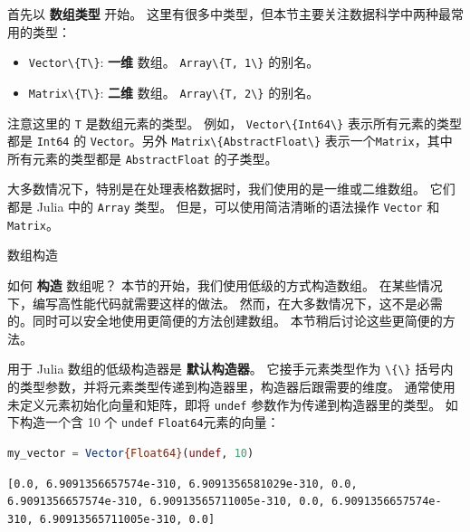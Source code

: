 \documentclass[
  notoc %
]{tufte-book}
\makeatletter
\providecommand{\tightlist}{%
  \setlength{\itemsep}{0pt}\setlength{\parskip}{0pt}
}
\newcommand{\passthrough}[1]{#1}
\renewcommand\subsubsection{%
\@startsection{subsubsection}{3}{\z@ }{-3.25ex\@plus -1ex \@minus -.2ex}{1.5ex \@plus .2ex}{\normalfont \normalsize \bfseries }
}
\makeatother
\begin{document}
首先以 \textbf{数组类型} 开始。
这里有很多中类型，但本节主要关注数据科学中两种最常用的类型：

\begin{itemize}
\tightlist
\item
  \passthrough{\lstinline!Vector\{T\}!}: \textbf{一维} 数组。
  \passthrough{\lstinline!Array\{T, 1\}!} 的别名。
\item
  \passthrough{\lstinline!Matrix\{T\}!}: \textbf{二维} 数组。
  \passthrough{\lstinline!Array\{T, 2\}!} 的别名。
\end{itemize}

注意这里的 \passthrough{\lstinline!T!} 是数组元素的类型。 例如，
\passthrough{\lstinline!Vector\{Int64\}!} 表示所有元素的类型都是
\passthrough{\lstinline!Int64!} 的
\passthrough{\lstinline!Vector!}。另外
\passthrough{\lstinline!Matrix\{AbstractFloat\}!}
表示一个\passthrough{\lstinline!Matrix!}，其中所有元素的类型都是
\passthrough{\lstinline!AbstractFloat!} 的子类型。

大多数情况下，特别是在处理表格数据时，我们使用的是一维或二维数组。
它们都是 Julia 中的 \passthrough{\lstinline!Array!} 类型。
但是，可以使用简洁清晰的语法操作 \passthrough{\lstinline!Vector!} 和
\passthrough{\lstinline!Matrix!}。

\hypertarget{sec:array_construction}{%
\subsubsection{数组构造}\label{sec:array_construction}}

如何 \textbf{构造} 数组呢？ 本节的开始，我们使用低级的方式构造数组。
在某些情况下，编写高性能代码就需要这样的做法。
然而，在大多数情况下，这不是必需的。同时可以安全地使用更简便的方法创建数组。
本节稍后讨论这些更简便的方法。

用于 Julia 数组的低级构造器是 \textbf{默认构造器}。 它接手元素类型作为
\passthrough{\lstinline!\{\}!}
括号内的类型参数，并将元素类型传递到构造器里，构造器后跟需要的维度。
通常使用未定义元素初始化向量和矩阵，即将 \passthrough{\lstinline!undef!}
参数作为传递到构造器里的类型。 如下构造一个含 10 个
\passthrough{\lstinline!undef!}
\passthrough{\lstinline!Float64!}元素的向量：

\begin{lstlisting}[language=Julia]
my_vector = Vector{Float64}(undef, 10)
\end{lstlisting}

\begin{lstlisting}[language=Output]
[0.0, 6.9091356657574e-310, 6.9091356581029e-310, 0.0, 6.9091356657574e-310, 6.90913565711005e-310, 0.0, 6.9091356657574e-310, 6.90913565711005e-310, 0.0]
\end{lstlisting}
\end{document}
